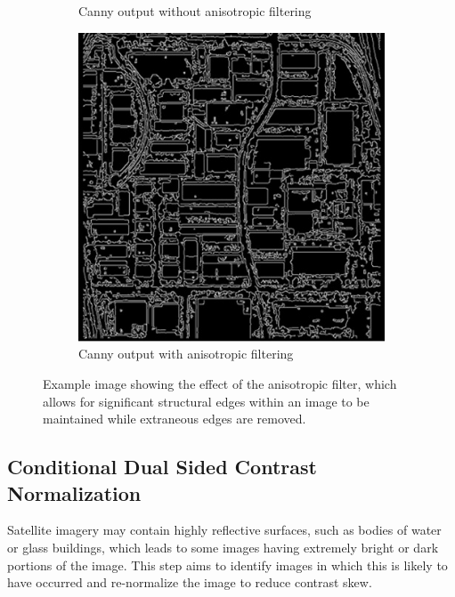 \documentclass[conference]{IEEEtran}
\begin{document}
\begin{figure}
\begin{center}
\begin{subfigure}[b]{0.48\linewidth}
        \caption{Canny output without anisotropic filtering \label{subfig:anisotropic_b}}
    \end{subfigure}
    \begin{subfigure}[b]{0.48\linewidth}
        \centerline{\includegraphics[width=\linewidth]{anisotropic_c.JPG}}
        \caption{Canny output with anisotropic filtering \label{subfig:anisotropic_c}}
    \end{subfigure}
    \end{center}
\caption{Example image showing the effect of the anisotropic filter, which allows for significant structural edges within an image to be maintained while extraneous edges are removed.}
\label{fig:anisotropic}
\end{figure}

\subsection{Conditional Dual Sided Contrast Normalization}
\label{subsec:CN}

Satellite imagery may contain highly reflective surfaces, such as bodies of water or glass buildings, which leads to some images having extremely bright or dark portions of the image. This step aims to identify images in which this is likely to have occurred and re-normalize the image to reduce contrast skew. 
\end{document}
